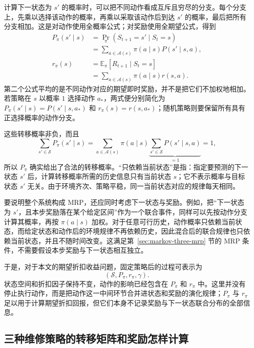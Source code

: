 \documentclass[UTF8,12pt,a4paper,fontset=fandol]{ctexart}
\begin{document}
计算下一状态为 $s'$ 的概率时，可以把不同动作看成互斥且穷尽的分支。每个分支上，先乘以选择该动作的概率，再乘以采取该动作后到达 $s'$ 的概率，最后把所有分支相加。这是对动作使用全概率公式；对奖励使用全期望公式，得到
\begin{equation}
  \begin{aligned}
    P_\pi(s'\mid s)
      &=\Pr_\pi(S_{t+1}=s'\mid S_t=s)\\
      &=\sum_{a\in\mathcal A(s)}\pi(a\mid s)P(s'\mid s,a),\\
    r_\pi(s)
      &=\mathbb E_\pi[R_{t+1}\mid S_t=s]\\
      &=\sum_{a\in\mathcal A(s)}\pi(a\mid s)r(s,a).
  \end{aligned}
  \label{eq:markov-three-induced}
\end{equation}
第二个公式平均的是不同动作对应的期望即时奖励，并不是把它们不加权地相加。若策略在 $s$ 以概率 $1$ 选择动作 $a_*$，两式便分别简化为 $P_\pi(s'\mid s)=P(s'\mid s,a_*)$ 和 $r_\pi(s)=r(s,a_*)$；随机策略则要保留所有具有正选择概率的动作分支。

这些转移概率非负，而且
\[
  \sum_{s'\in\mathcal S}P_\pi(s'\mid s)
  =\sum_{a\in\mathcal A(s)}\pi(a\mid s)
    \underbrace{\sum_{s'\in\mathcal S}P(s'\mid s,a)}_{=1}
  =1,
\]
所以 $P_\pi$ 确实给出了合法的转移概率。“只依赖当前状态”是指：指定要预测的下一状态 $s'$ 后，计算转移概率所需的历史信息只有当前状态 $s$；它不表示概率与目标状态 $s'$ 无关。由于环境齐次、策略平稳，同一当前状态对应的规律每天相同。

要说明整个系统构成 MRP，还应同时考虑下一状态与奖励。例如，把“下一状态为 $s'$，且本步奖励落在某个给定区间”作为一个联合事件，同样可以先按动作分支计算其概率，再按 $\pi(a\mid s)$ 加权。对于任意可行历史，动作概率只依赖当前状态，而给定状态和动作后的环境规律不再依赖历史，因此混合后的联合规律也只依赖当前状态，并且不随时间改变。这满足第~\ref{sec:markov-three-mrp} 节的 MRP 条件，不需要假设本步奖励与下一状态相互独立。

于是，对于本文的期望折扣收益问题，固定策略后的过程可表示为
\[
  (\mathcal S,P_\pi,r_\pi,\gamma).
\]
状态空间和折扣因子保持不变，动作的影响已经包含在 $P_\pi$ 和 $r_\pi$ 中。这里并没有停止执行动作，而是把动作这一中间环节合并进状态和奖励的演化规律；$P_\pi$ 与 $r_\pi$ 足以用于计算期望折扣回报，但它们本身不记录奖励与下一状态联合分布的全部信息。

\subsection{三种维修策略的转移矩阵和奖励怎样计算}
\end{document}

